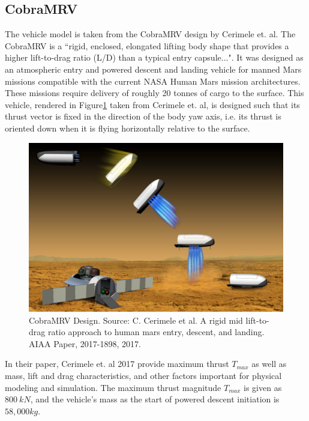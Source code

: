 \subsection{CobraMRV} \label{sec:CobraMRV}
The vehicle model is taken from the CobraMRV design by Cerimele et. al\:\cite{CERIMELE}. The CobraMRV is a ``rigid, enclosed, elongated lifting body shape that provides a higher lift-to-drag ratio (L/D) than a typical entry capsule...". It was designed as an atmospheric entry and powered descent and landing vehicle for manned Mars missions compatible with the current NASA Human Mars mission architectures. These missions require delivery of roughly 20 tonnes of cargo to the surface. This vehicle, rendered in Figure\:\ref{fig:CobraMRV} taken from Cerimele et. al, is designed such that its thrust vector is fixed in the direction of the body yaw axis, i.e. its thrust is oriented down when it is flying horizontally relative to the surface. 

\begin{figure}[H]
	\centering
	\begin{minipage}{4.3 in}
		\includegraphics[width=\linewidth]{Figures/CobraMRV.png}
		\caption{CobraMRV Design. Source: C. Cerimele et al. A rigid mid lift-to-drag ratio approach to human mars entry, descent,
			and landing. AIAA Paper, 2017-1898, 2017. \label{fig:CobraMRV} }
	\end{minipage}
\end{figure}

In their paper, Cerimele et. al 2017\:\cite{CERIMELE} provide maximum thrust $T_{max}$ as well as mass, lift and drag characteristics, and other factors important for physical modeling and simulation. The maximum thrust magnitude $T_{max}$ is given as $800\:kN$, and the vehicle's mass as the start of powered descent initiation is $58,000 kg$.

